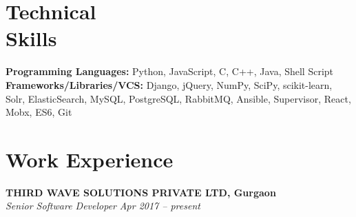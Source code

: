 \documentclass[margin,line]{resume}
\begin{document}
\begin{resume}
    \section{\mysidestyle Technical \\ Skills}
	\vspace{0mm}
	\textbf{Programming Languages:}	Python, JavaScript, C, C++, Java, Shell Script \\
      \textbf{Frameworks/Libraries/VCS:} Django, jQuery, NumPy, SciPy, scikit-learn, Solr, ElasticSearch, MySQL, PostgreSQL, RabbitMQ, Ansible, Supervisor, React, Mobx, ES6, Git
    \section{\mysidestyle Work Experience}
    \textbf{THIRD WAVE SOLUTIONS PRIVATE LTD, Gurgaon}\\
           \textsl{Senior Software Developer} \hfill \textsl{Apr 2017 -- present} \vspace{1mm}%
    \begin{itemize}


\end{itemize}
\end{resume}
\end{document}
